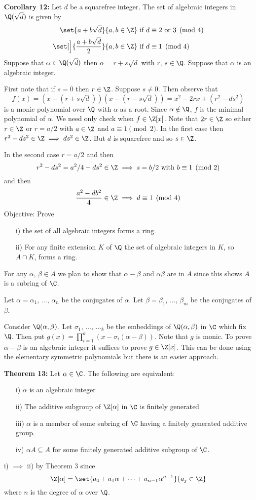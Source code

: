 \textbf{Corollary 12:} Let $d$ be a squarefree integer.  The set of algebraic integers in $\Q(\sqrt{d})$ is given by
\begin{align*}
\set{a+b\sqrt{d}}{a,b\in\Z} & \text{ if $d\equiv 2 \text{ or } 3\pmod 4$} \\
\set[\Big]{\frac{a+b\sqrt{d}}{2}}{a,b\in\Z} & \text{ if $d\equiv1\pmod4$}
\end{align*}
\pf Suppose that $\alpha\in\Q(\sqrt{d})$ then $\alpha=r+s\sqrt{d}$ with $r$, $s\in\Q$.  Suppose that $\alpha$ is an algebraic integer.

First note that if $s=0$ then $r\in\Z$.  Suppose $s\neq0$.  Then observe that
\[ f(x) = (x-(r+s\sqrt{d}))(x-(r-s\sqrt{d}))=x^2-2rx+(r^2-ds^2) \]
is a monic polynomial over $\Q$ with $\alpha$ as a root.  Since $\alpha\notin\Q$, $f$ is the minimal polynomial of $\alpha$.  We need only check when $f\in\Z[x]$.  Note that $2r\in\Z$ so either $r\in\Z$ or $r=a/2$ with $a\in\Z$ and $a\equiv1\pmod2$.  In the first case then $r^2-ds^2\in\Z\implies ds^2\in\Z$.  But $d$ is squarefree and so $s\in\Z$.

In the second case $r=a/2$ and then
\[ r^2-ds^2 = a^2/4 - d s^2 \in \Z \implies s = b/2 \text{ with } b\equiv1\pmod 2 \]
and then
\[ \frac{a^2-db^2}{4} \in \Z \implies d\equiv 1 \pmod 4 \]
Objective: Prove \begin{enumerate}
\item[i)] the set of all algebraic integers forms a ring.
\item[ii)] For any finite extension $K$ of $\Q$ the set of algebraic integers in $K$, so $A\cap K$, forms a ring.
\end{enumerate}
For any $\alpha$, $\beta\in A$ we plan to show that $\alpha-\beta$ and $\alpha\beta$ are in $A$ since this shows $A$ is a subring of $\C$.

Let $\alpha=\alpha_1$, $\dotsc$, $\alpha_n$ be the conjugates of $\alpha$.  Let $\beta=\beta_1$, $\dotsc$, $\beta_m$ be the conjugates of $\beta$.

Consider $\Q(\alpha,\beta)$.  Let $\sigma_1$, $\dotsc$, $\dots_k$ be the embeddings of $\Q(\alpha,\beta)$ in $\C$ which fix $\Q$.  Then put $g(x)=\prod_{i=1}^k(x-\sigma_i(\alpha-\beta))$.  Note that $g$ is monic.  To prove $\alpha-\beta$ is an algebraic integer it suffices to prove $g\in\Z[x]$.  This can be done using the elementary symmetric polynomials but there is an easier approach.

\textbf{Theorem 13:} Let $\alpha\in\C$.  The following are equivalent:
\begin{enumerate}
\item[i)] $\alpha$ is an algebraic integer
\item[ii)] The additive subgroup of $\Z[\alpha]$ in $\C$ is finitely generated
\item[iii)] $\alpha$ is a member of some subring of $\C$ having a finitely generated additive group.
\item[iv)] $\alpha A\subseteq A$ for some finitely generated additive subgroup of $\C$.
\end{enumerate}
\pf i) $\implies$ ii) by Theorem 3 since
\[ \Z[\alpha] = \set{a_0+a_1\alpha+\dotsb+a_{n-1}\alpha^{n-1}}{a_j\in\Z} \]
where $n$ is the degree of $\alpha$ over $\Q$.

